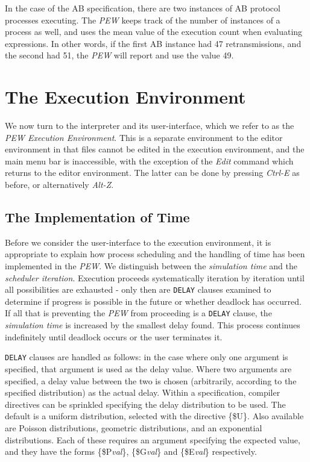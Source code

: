 In the case of the AB specification, there are two instances of AB
protocol processes executing. The {\em PEW} keeps track of the number
of instances of a process as well, and uses the mean value of the
execution count when evaluating expressions. In other words, if the
first AB instance had 47 retransmissions, and the second had 51, the
{\em PEW} will report and use the value 49.

\newpage
\section[The Execution Environment]{The Execution Environment}
\label{execenv}

We now turn to the interpreter and its user-interface, which we refer
to as the {\em PEW Execution Environment}. This is a separate
environment to the editor environment in that files cannot be edited
in the execution environment, and the main menu bar is inaccessible,
with the exception of the {\em Edit} command which returns to the editor
environment. The latter can be done by pressing {\em Ctrl-E} as
before, or alternatively {\em Alt-Z}.

\subsection[The Implementation of Time]{The Implementation of Time}
Before we consider the user-interface to the execution environment,
it is appropriate to explain how process scheduling and the handling
of time has been implemented in the {\em PEW}. 
We distinguish between the {\em simulation time} and the {\em
scheduler iteration}.
Execution proceeds systematically iteration by iteration until
all possibilities  are exhausted  - only  then are {\tt DELAY} clauses
examined to  determine if  progress is possible in the future or
whether deadlock  has occurred.  If all  that is  preventing the {\em
PEW} from proceeding is a {\tt DELAY} clause, the {\em simulation
time} is
increased by the smallest delay found. This  process  continues
indefinitely  until deadlock occurs or the user terminates it.

{\tt DELAY} clauses are handled as follows: in the case where only
one argument is specified, that argument is used as the delay value.
Where two arguments are specified, a delay value between the two is
chosen (arbitrarily, according to the specified distribution)
as the actual delay. Within a specification, compiler directives can
be sprinkled specifying the delay distribution to be used. The
default is a uniform distribution, selected with the directive
\{\$U\}.
Also available are Poisson distributions, geometric distributions,
and an exponential distributions. Each of these requires an argument
specifying the expected value, and they have the forms \{\$P{\em val}\},
\{\$G{\em val}\} and \{\$E{\em val}\} respectively.

